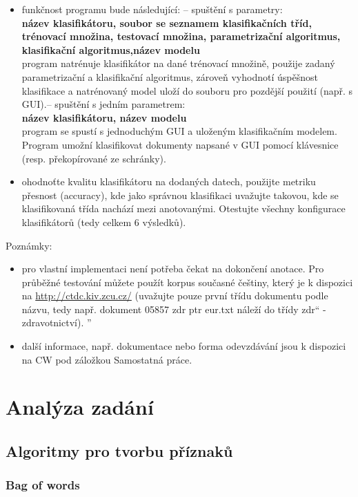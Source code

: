 \documentclass[ 12pt, a4paper]{article}
\begin{document}
\begin{itemize}
\item funkčnost programu bude následující:
– spuštění s parametry:\\
\textbf{název klasifikátoru, soubor se seznamem klasifikačních tříd, trénovací množina, testovací množina, parametrizační algoritmus, klasifikační algoritmus,název modelu}\\
program natrénuje klasifikátor na dané trénovací množině, použije zadaný parametrizační a klasifikační algoritmus, zároveň vyhodnotí úspěšnost klasifikace a natrénovaný model uloží do souboru pro pozdější použití (např. s GUI).– spuštění s jedním parametrem:\\
\textbf{název klasifikátoru, název modelu} \\
program se spustí s jednoduchým GUI a uloženým klasifikačním modelem. Program umožní klasifikovat dokumenty napsané v GUI pomocí klávesnice (resp. překopírované ze schránky).

\item ohodnoťte kvalitu klasifikátoru na dodaných datech, použijte metriku přesnost (accuracy), kde jako správnou klasifikaci uvažujte takovou, kde se klasifikovaná třída nachází mezi anotovanými. Otestujte všechny konfigurace klasifikátorů (tedy celkem 6 výsledků).
\end{itemize}


Poznámky:
\begin{itemize}
\item pro vlastní implementaci není potřeba čekat na dokončení anotace. Pro průběžné testování můžete použít korpus současné češtiny, který je k dispozici na \url{http://ctdc.kiv.zcu.cz/} (uvažujte pouze první třídu dokumentu podle názvu, tedy např.
dokument 05857 zdr ptr eur.txt náleží do třídy zdr“ - zdravotnictví).
”
\item další informace, např. dokumentace nebo forma odevzdávání jsou k dispozici na CW pod záložkou Samostatná práce.

\end{itemize}
\newpage
\section{Analýza zadání}

\subsection{Algoritmy pro tvorbu příznaků}
\subsubsection{Bag of words}
\end{document}
